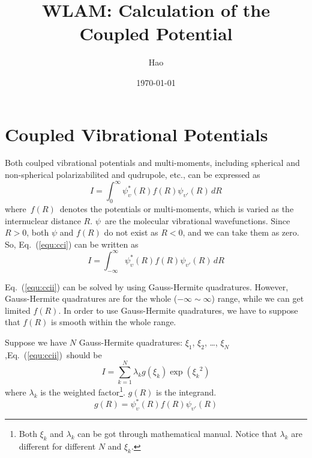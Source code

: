 \documentclass[aps,pra,groupedaddress,
                amsfonts,amssymb,
                preprint
    ]{revtex4}
\newcommand{\molnwv}{\psi}
\newcommand{\vibqu}{\upsilon}
\begin{document}
%
\date{\today}
%
\title[WLAM: Calculation of the coupled potential]
{WLAM: Calculation of the Coupled Potential}

\author{Hao }

\maketitle

\section{Coupled Vibrational Potentials}
Both coulped vibrational potentials and multi-moments, including
spherical and non-spherical polarizabilited and qudrupole, etc., can be
expressed as
\begin{equation}  \label{equ:cci}
I = \int_0^\infty \molnwv_\vibqu^*(R)f(R)\molnwv_{\vibqu'}(R)\,dR
\end{equation}
where~$f(R)$~denotes the potentials or multi-moments, which is varied as
the internuclear distance $R$. $\molnwv$~are the molecular vibrational
wavefunctions. Since $R > 0$, both $\molnwv$ and $f(R)$ do not exist as
$R < 0$, and we can take them as zero. So, Eq.~(\ref{equ:cci}) can be
written as
\begin{equation}  \label{equ:ccii}
I = \int_{-\infty}^\infty \molnwv_\vibqu^*(R)f(R)\molnwv_{\vibqu'}(R)\,dR
\end{equation}

Eq.~(\ref{equ:ccii}) can be solved by using Gauss-Hermite quadratures.
However, Gauss-Hermite quadratures are for the whole ($-\infty \sim
\infty$) range, while we can get limited $f(R)$. In order to use
Gauss-Hermite quadratures, we have to suppose that $f(R)$ is smooth
within the whole range.

Suppose we have $N$ Gauss-Hermite quadratures: $\xi_1$, $\xi_2$, \dots,
$\xi_{N}$,Eq.~(\ref{equ:ccii})~should be
\begin{equation}  \label{equ:gauss-hermite}
I = \sum_{k=1}^{N}\lambda_k g(\xi_k)\exp\left({\xi_k}^2\right)
\end{equation}
where $\lambda_k$ is the weighted factor\footnote{Both $\xi_k$ and
  $\lambda_k$ can be got through mathematical manual. Notice that
  $\lambda_k$ are different for different $N$ and $\xi_k$.}. $g(R)$ is
the integrand.
\begin{equation}
g(R)=\molnwv_\vibqu^*(R)f(R)\molnwv_{\vibqu'}(R)
\end{equation}
\end{document}

